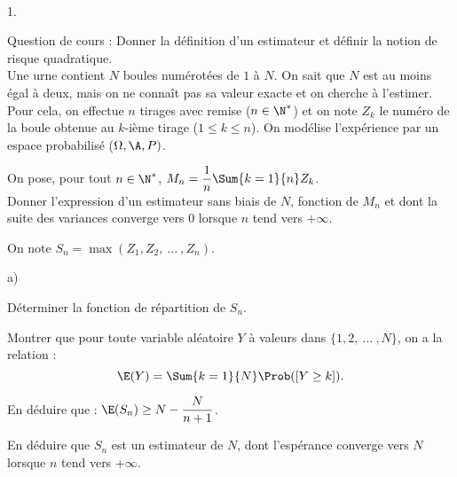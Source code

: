 \documentclass[11pt]{article}%
\begin{document}
\newpage


\begin{exerciceAP}~
  \begin{noliste}{1.}
    \setlength{\itemsep}{2mm}
  \item Question de cours : Donner la définition d'un estimateur et
    définir la notion de risque quadratique.\\[.2cm]
    Une urne contient $N$ boules numérotées de $1$ à $N$. On sait que
    $N$ est au moins égal à deux, mais on ne connaît pas sa valeur
    exacte et on cherche à l'estimer. Pour cela, on effectue $n$ tirages
    avec remise ($n \in \N^*$) et on note $Z_k$ le numéro de la
    boule obtenue au $k$-ième tirage ($1 \leq k \leq n$). On modélise
    l'expérience par un espace probabilisé ($\Omega , \A , P)$.
  \item On pose, pour tout $n \in \N^*$, $M_n = \dfrac{1}{n}
    \Sum{k=1}{n} Z_k$. \\
    Donner l'expression d'un estimateur sans biais de $N$, fonction de
    $M_n$ et dont la suite des variances converge vers 0 lorsque $n$
    tend vers $+\infty$.
  \item On note $S_n = \max ( Z_1 , Z_2 ,\ \dots\ , Z_n)$.
    \begin{noliste}{a)}
      \setlength{\itemsep}{2mm}
    \item Déterminer la fonction de répartition de $S_n$.
    \item Montrer que pour toute variable aléatoire $Y$ à valeurs dans
      $\{ 1 , 2,\ \dots\ , N \}$, on a la relation :
      \[
      \E(Y) = \Sum{k=1}{N} \Prob( [ Y \geq k ]). 
      \]
    \item En déduire que : $\E( S_n) \geq N - \dfrac{N}{n+1}$.
    \item En déduire que $S_n$ est un estimateur de $N$, dont
      l'espérance converge vers $N$ lorsque $n$ tend vers $+\infty$.
    \end{noliste}
  \end{noliste}
\end{exerciceAP}
\end{document}
